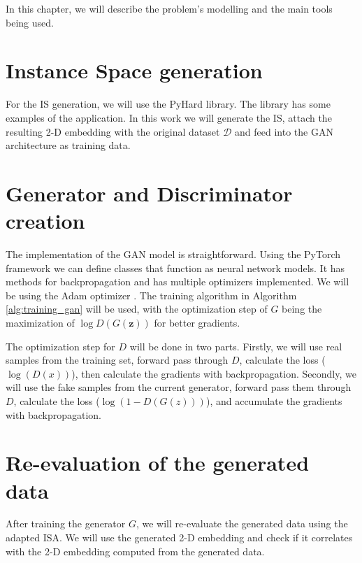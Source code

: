 In this chapter, we will describe the problem's modelling and the main tools being used.

\section{Instance Space generation}

For the IS generation, we will use the PyHard \cite{Lorena2022} library. The library has some examples of the application. In this work we will generate the IS, attach the resulting 2-D embedding with the original dataset $\mathcal{D}$ and feed into the GAN architecture as training data.

\section{Generator and Discriminator creation}

The implementation of the GAN model is straightforward. Using the PyTorch \cite{paszke2019pytorch} framework we can define classes that function as neural network models. It has methods for backpropagation and has multiple optimizers implemented. We will be using the Adam optimizer \cite{kingma2017adam}. The training algorithm in Algorithm \ref{alg:training_gan} will be used, with the optimization step of $G$ being the maximization of $\log D\left( G\left( \mathbf{z} \right) \right)$ for better gradients. 

The optimization step for $D$ will be done in two parts. Firstly, we will use real samples from the training set, forward pass through $D$, calculate the loss ($\log(D(x))$), then calculate the gradients with backpropagation. Secondly, we will use the fake samples from the current generator, forward pass them through $D$, calculate the loss ($\log(1-D(G(z)))$), and accumulate the gradients with backpropagation.

\section{Re-evaluation of the generated data}

After training the generator $G$, we will re-evaluate the generated data using the adapted ISA. We will use the generated 2-D embedding and check if it correlates with the 2-D embedding computed from the generated data.